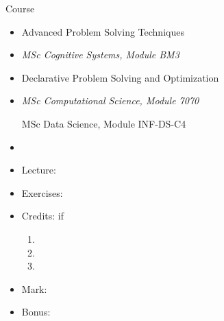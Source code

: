 \begin{frame}{Course}
  \begin{itemize}
  \item<1|only@1> \alert{Advanced Problem Solving Techniques}
  \item<1|only@1> [] {\em MSc Cognitive Systems, Module BM3\par\phantom{MSc}}
  \item<2|only@2> \alert{Declarative Problem Solving and Optimization}
  \item<2|only@2> [] {\em MSc Computational Science, Module 7070\par
                          MSc Data Science, Module INF-DS-C4}
  \item []
  \item Lecture:    \only<1,2>{2h weekly}
  \item Exercises:  
  \item Credits:    
    if
    \begin{enumerate}
    \item {}
    \item {}
    \item {}
    \end{enumerate}
  \item Mark: 
  \item Bonus: 
  \end{itemize}
\end{frame}
%
